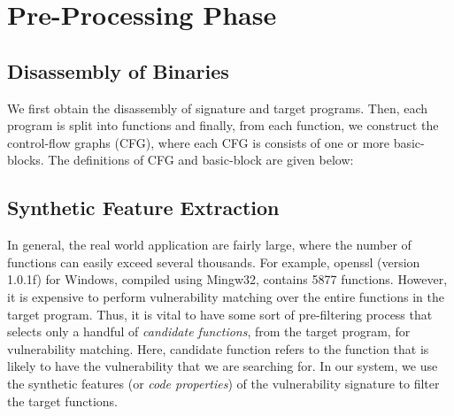 \section{Pre-Processing Phase}\label{sec:pre-proc}


\subsection{Disassembly of Binaries}
We first obtain the disassembly of signature and target programs. Then, each program is split into functions and finally, from each function, we construct the control-flow graphs (CFG), where each CFG is consists of one or more basic-blocks. The definitions of CFG and basic-block are given below:


\subsection{Synthetic Feature Extraction} \label{subsec:syn_fea}

In general, the real world application are fairly large, where the number of functions can easily exceed several thousands. For example, openssl (version 1.0.1f) for Windows, compiled using Mingw32, contains 5877 functions. However, it is expensive to perform vulnerability matching over the entire functions in the target program. Thus, it is vital to have some sort of pre-filtering process that selects only a handful of \textit{candidate functions}, from the target program, for vulnerability matching. Here, candidate function refers to the function that is likely to have the vulnerability that we are searching for. In our system, we use the synthetic features (or \textit{code properties}) of the vulnerability signature to filter the target functions.

